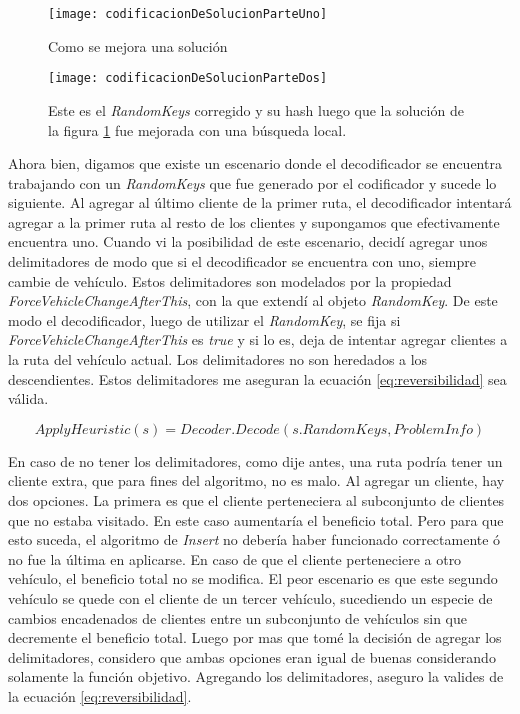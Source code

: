 \bigskip

\begin{figure}[h]
	\caption{Como se mejora una solución}
	\centering
	\texttt{[image: codificacionDeSolucionParteUno]}
	\label{fig:codificacionDeSolucionUno}
\end{figure}

\begin{figure}[h]
    \caption{Este es el \textit{RandomKeys} corregido y su hash luego que la solución de la figura \ref{fig:codificacionDeSolucionUno} fue mejorada con una búsqueda local.}
    \centering
    \texttt{[image: codificacionDeSolucionParteDos]}
    \label{fig:codificacionDeSolucionDos}
\end{figure} 


\bigskip

Ahora bien, digamos que existe un escenario donde el decodificador se encuentra trabajando con un \textit{RandomKeys} que fue generado por el codificador y sucede lo siguiente. Al agregar al último cliente de la primer ruta, el decodificador intentará agregar a la primer ruta al resto de los clientes y supongamos que efectivamente encuentra uno. Cuando vi la posibilidad de este escenario, decidí agregar unos delimitadores de modo que si el decodificador se encuentra con uno, siempre cambie de vehículo. Estos delimitadores son modelados por la propiedad \textit{ForceVehicleChangeAfterThis}, con la que extendí al objeto \textit{RandomKey}. De este modo el decodificador, luego de utilizar el \textit{RandomKey}, se fija si \textit{ForceVehicleChangeAfterThis} es \textit{true} y si lo es, deja de intentar agregar clientes a la ruta del vehículo actual. Los delimitadores no son heredados a los descendientes. Estos delimitadores me aseguran la ecuación \ref{eq:reversibilidad} sea válida.

\begin{equation} \label{eq:reversibilidad}
ApplyHeuristic(s) = Decoder.Decode(s.RandomKeys, ProblemInfo)
\end{equation}

\bigskip

En caso de no tener los delimitadores, como dije antes, una ruta podría tener un cliente extra, que para fines del algoritmo, no es malo. Al agregar un cliente, hay dos opciones. La primera es que el cliente perteneciera al subconjunto de clientes que no estaba visitado. En este caso aumentaría el beneficio total. Pero para que esto suceda, el algoritmo de \textit{Insert} no debería haber funcionado correctamente ó no fue la última en aplicarse. En caso de que el cliente perteneciere a otro vehículo, el beneficio total no se modifica. El peor escenario es que este segundo vehículo se quede con el cliente de un tercer vehículo, sucediendo un especie de cambios encadenados de clientes entre un subconjunto de vehículos sin que decremente el beneficio total. Luego por mas que tomé la decisión de agregar los delimitadores, considero que ambas opciones eran igual de buenas considerando solamente la función objetivo. Agregando los delimitadores, aseguro la valides de la ecuación \ref{eq:reversibilidad}.

